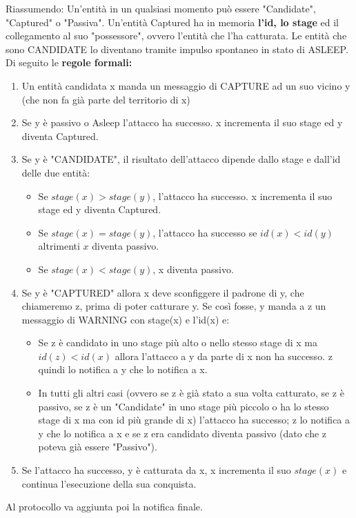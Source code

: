 Riassumendo: Un'entità in un qualsiasi momento può essere "Candidate", "Captured" o "Passiva". Un'entità Captured ha in memoria \textbf{l'id, lo stage} ed il collegamento al suo "possessore", ovvero l'entità che l'ha catturata. Le entità che sono CANDIDATE lo diventano tramite impulso spontaneo in stato di ASLEEP.
Di seguito le \textbf{regole formali:}
\begin{enumerate}
\item Un entità candidata x manda un messaggio di CAPTURE ad un suo vicino y (che non fa già parte del territorio di x)
\item Se y è passivo o Asleep l'attacco ha successo. x incrementa il suo stage ed y diventa Captured.
\item Se y è "CANDIDATE", il risultato dell'attacco dipende dallo stage e dall'id delle due entità:
\begin{itemize}
    \item Se $stage(x) > stage(y)$, l'attacco ha successo. x incrementa il suo stage ed y diventa Captured.
    \item Se $stage(x) = stage(y)$, l'attacco ha successo se $id(x) < id(y)$ altrimenti $x$ diventa passivo.
    \item Se $stage(x) < stage(y)$, x diventa passivo.
\end{itemize}
\item Se y è "CAPTURED" allora x deve sconfiggere il padrone di y, che chiameremo z, prima di poter catturare y. Se così fosse, y manda a z un messaggio di WARNING con stage(x) e l'id(x) e:
\begin{itemize}
\item Se z è candidato in uno stage più alto o nello stesso stage di x ma $id(z) < id(x)$ allora l'attacco a y da parte di x non ha successo. z quindi lo notifica a y che lo notifica a x.
\item In tutti gli altri casi (ovvero se z è già stato a sua volta catturato, se z è passivo, se z è un "Candidate" in uno stage più piccolo o ha lo stesso stage di x ma con id più grande di x) l'attacco ha successo; z lo notifica a y che lo notifica a x e se z era candidato diventa passivo (dato che z poteva già essere "Passivo").
\end{itemize}
\item Se l'attacco ha successo, y è catturata da x, x incrementa il suo $stage(x)$ e continua l'esecuzione della sua conquista.
\end{enumerate}
Al protocollo va aggiunta poi la notifica finale.
\\
